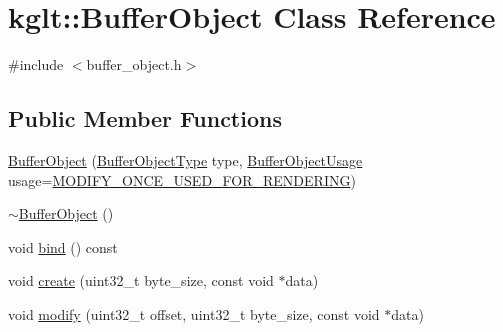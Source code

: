 \hypertarget{classkglt_1_1_buffer_object}{\section{kglt\-:\-:Buffer\-Object Class Reference}
\label{classkglt_1_1_buffer_object}
}


{\ttfamily \#include $<$buffer\-\_\-object.\-h$>$}

\subsection*{Public Member Functions}
\begin{DoxyCompactItemize}
\item 
\hyperlink{classkglt_1_1_buffer_object_afe5fd28f697241e8ae8e5b4f30fa25ed}{Buffer\-Object} (\hyperlink{namespacekglt_aacaa83f89296ac24671ad3db1d5cb2ee}{Buffer\-Object\-Type} type, \hyperlink{namespacekglt_a964a917aefb575ce817a16ccb32579f3}{Buffer\-Object\-Usage} usage=\hyperlink{namespacekglt_a964a917aefb575ce817a16ccb32579f3a1fa8b4c7d6f629b6dd3ecb42f3fe844d}{M\-O\-D\-I\-F\-Y\-\_\-\-O\-N\-C\-E\-\_\-\-U\-S\-E\-D\-\_\-\-F\-O\-R\-\_\-\-R\-E\-N\-D\-E\-R\-I\-N\-G})
\item 
\hyperlink{classkglt_1_1_buffer_object_a3729954ea1327621644539d9b84a36bf}{$\sim$\-Buffer\-Object} ()
\item 
void \hyperlink{classkglt_1_1_buffer_object_abfdc32bf0d5d97f33c2828c6ce897405}{bind} () const 
\item 
void \hyperlink{classkglt_1_1_buffer_object_a93536ac3024315a4a8357f411f980cb3}{create} (uint32\-\_\-t byte\-\_\-size, const void $\ast$data)
\item 
void \hyperlink{classkglt_1_1_buffer_object_a2cbd1d51ab21761e6f5e24fc9f8471a9}{modify} (uint32\-\_\-t offset, uint32\-\_\-t byte\-\_\-size, const void $\ast$data)
\end{DoxyCompactItemize}


